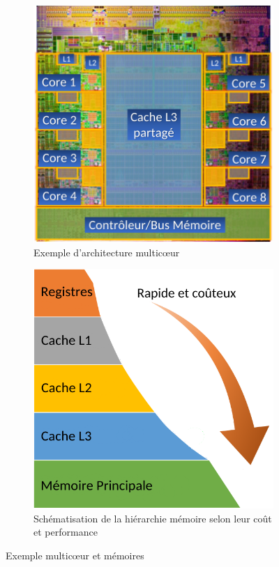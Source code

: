 \documentclass[french, a4paper, 11pt, twoside, pdftex]{StyleThese}
\begin{document}
\begin{figure}[h]
	\centering
	\begin{subfigure}{.45\textwidth} \centering
		\includegraphics[width=0.9\linewidth]{schemas/multicoeurIntel}
		\caption{Exemple d'architecture multicœur}
		\label{fig:multicoeurintel}
	\end{subfigure}			
	\begin{subfigure}{.45\textwidth} \centering
		\includegraphics[width=0.85\linewidth]{schemas/hierarchieMemoire}
		\caption[Hiérarchie mémoire]{Schématisation de la hiérarchie mémoire selon leur coût et performance}
		\label{fig:hierarchiememoire}
	\end{subfigure}
	\caption{Exemple multicœur et mémoires}
	\label{fig:multicoeurs}
\end{figure}
\end{document}
